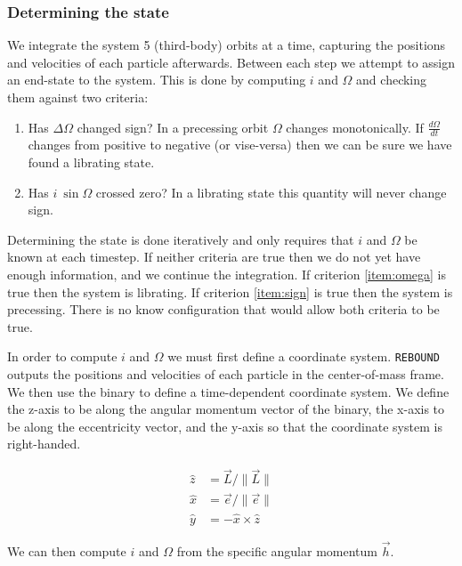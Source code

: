 \documentclass[twocolumn]{aastex631}
\begin{document}
\subsubsection{Determining the state}
\label{subsubsec:state}
We integrate the system 5 (third-body) orbits at a time, capturing the positions and velocities of each particle afterwards.
Between each step we attempt to assign an end-state to the system. This is done by computing $i$ and $\Omega$ and checking them against
two criteria:
\begin{enumerate}
    \item Has $\Delta\Omega$ changed sign? In a precessing orbit $\Omega$ changes monotonically. If 
    $\frac{d\Omega}{dt}$ changes from positive to negative (or vise-versa) then we can be sure we have found a librating state.
    \label{item:omega}
    \item Has $i~\sin{\Omega}$ crossed zero? In a librating state this quantity will never change sign. 
    \label{item:sign}
\end{enumerate}
 Determining the state is done iteratively and only requires that $i$ and $\Omega$
be known at each timestep. If neither criteria are true then we do not yet have enough information, and we continue the integration.
If criterion \ref{item:omega} is true then the system is librating. If criterion \ref{item:sign} is true then the system is precessing.
There is no know configuration that would allow both criteria to be true.

In order to compute $i$ and $\Omega$ we must first define a coordinate system. \texttt{REBOUND} outputs the positions and
velocities of each particle in the center-of-mass frame. We then use the binary to define a time-dependent coordinate system.
We define the z-axis to be along the angular momentum vector of the binary, the x-axis to be along the eccentricity vector, and the
y-axis so that the coordinate system is right-handed.

\begin{equation}
\begin{aligned}
    \hat{z} & = \vec{L}/\|\vec{L}\| \\
    \hat{x} & = \vec{e}/\|\vec{e}\| \\
    \hat{y} & = - \hat{x} \times \hat{z}
    \label{eq:coords}
\end{aligned}
\end{equation}

We can then compute $i$ and $\Omega$ from the specific angular momentum $\vec{h}$.
\end{document}
